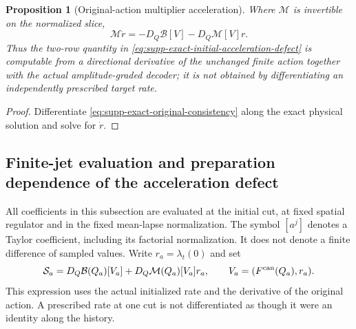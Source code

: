 \documentclass[11pt]{article}
\numberwithin{equation}{section}
\newtheorem{proposition}[proposition]{Proposition}
\theoremstyle{definition}
\theoremstyle{remark}
\begin{document}
\begin{proposition}[Original-action multiplier acceleration]
\label{prop:supp-exact-action-acceleration}
Where $\mathcal M$ is invertible on the normalized slice,
\begin{equation}
 \mathcal M\dot r
 =-D_Q\mathcal B[V]-D_Q\mathcal M[V]r.
 \label{eq:supp-exact-action-acceleration}
\end{equation}
Thus the two-row quantity in
\eqref{eq:supp-exact-initial-acceleration-defect} is computable from a
directional derivative of the unchanged finite action together with the
actual amplitude-graded decoder; it is not obtained by differentiating an
independently prescribed target rate.
\end{proposition}
\begin{proof}
Differentiate \eqref{eq:supp-exact-original-consistency} along the exact
physical solution and solve for $\dot r$.
\end{proof}

\subsection{Finite-jet evaluation and preparation dependence of the acceleration defect}
\label{subsec:supp-finite-acceleration}

All coefficients in this subsection are evaluated at the initial cut, at
fixed spatial regulator and in the fixed mean-lapse normalization.  The
symbol $[a^j]$ denotes a Taylor coefficient, including its factorial
normalization.  It does not denote a finite difference of sampled values.
Write $r_a=\lambda_t(0)$ and set
\begin{equation}
 \mathcal S_a=D_Q\mathcal B(Q_a)[V_a]
       +D_Q\mathcal M(Q_a)[V_a]r_a,
 \qquad V_a=(F^{\rm can}(Q_a),r_a).
 \label{eq:supp-finite-acc-source}
\end{equation}
This expression uses the actual initialized rate and the derivative of the
original action.  A prescribed rate at one cut is not differentiated as
though it were an identity along the history.
\end{document}
